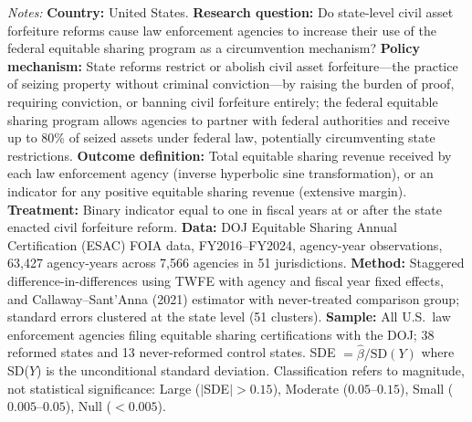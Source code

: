 \begin{table}[H]
{\footnotesize \raggedright \textit{Notes:} \textbf{Country:} United States. \textbf{Research question:} Do state-level civil asset forfeiture reforms cause law enforcement agencies to increase their use of the federal equitable sharing program as a circumvention mechanism? \textbf{Policy mechanism:} State reforms restrict or abolish civil asset forfeiture---the practice of seizing property without criminal conviction---by raising the burden of proof, requiring conviction, or banning civil forfeiture entirely; the federal equitable sharing program allows agencies to partner with federal authorities and receive up to 80\% of seized assets under federal law, potentially circumventing state restrictions. \textbf{Outcome definition:} Total equitable sharing revenue received by each law enforcement agency (inverse hyperbolic sine transformation), or an indicator for any positive equitable sharing revenue (extensive margin). \textbf{Treatment:} Binary indicator equal to one in fiscal years at or after the state enacted civil forfeiture reform. \textbf{Data:} DOJ Equitable Sharing Annual Certification (ESAC) FOIA data, FY2016--FY2024, agency-year observations, 63,427 agency-years across 7,566 agencies in 51 jurisdictions. \textbf{Method:} Staggered difference-in-differences using TWFE with agency and fiscal year fixed effects, and Callaway--Sant'Anna (2021) estimator with never-treated comparison group; standard errors clustered at the state level (51 clusters). \textbf{Sample:} All U.S.\ law enforcement agencies filing equitable sharing certifications with the DOJ; 38 reformed states and 13 never-reformed control states. SDE $= \hat{\beta} / \text{SD}(Y)$ where SD($Y$) is the unconditional standard deviation. Classification refers to magnitude, not statistical significance: Large ($|$SDE$| > 0.15$), Moderate ($0.05$--$0.15$), Small ($0.005$--$0.05$), Null ($< 0.005$).
\par}
\end{table}
